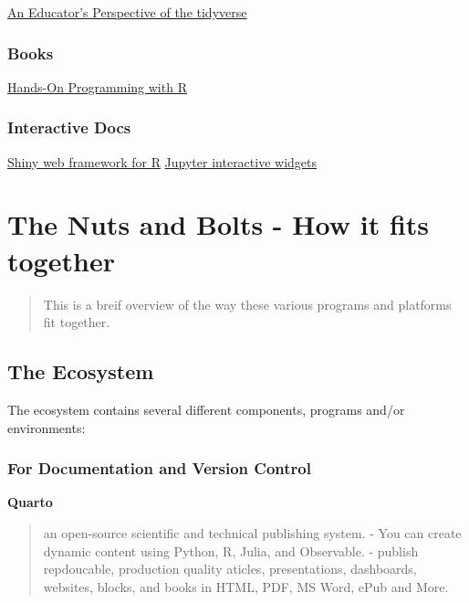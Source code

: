 \documentclass[
  letterpaper,
  DIV=11,
  numbers=noendperiod]{scrartcl}
\begin{document}
\href{https://mine-cetinkaya-rundel.github.io/tidyperspective/talks/dagstat-2022.html\#/title-slide}{An
Educator's Perspective of the tidyverse}

\subsubsection{Books}\label{books}

\href{https://jjallaire.github.io/hopr/}{Hands-On Programming with R}

\subsubsection{Interactive Docs}\label{interactive-docs}

\href{https://jjallaire.shinyapps.io/diamonds-explorer/}{Shiny web
framework for R}
\href{https://quarto.org/docs/interactive/widgets/jupyter.html}{Jupyter
interactive widgets}

\section{The Nuts and Bolts - How it fits
together}\label{the-nuts-and-bolts---how-it-fits-together}

\begin{quote}
This is a breif overview of the way these various programs and platforms
fit together.
\end{quote}

\subsection{The Ecosystem}\label{the-ecosystem}

The ecosystem contains several different components, programs and/or
environments:

\subsubsection{For Documentation and Version
Control}\label{for-documentation-and-version-control}

\textbf{Quarto}

\begin{quote}
an open-source scientific and technical publishing system. - You can
create dynamic content using Python, R, Julia, and Observable. - publish
repdoucable, production quality aticles, presentations, dashboards,
websites, blocks, and books in HTML, PDF, MS Word, ePub and More.
\end{quote}
\end{document}
